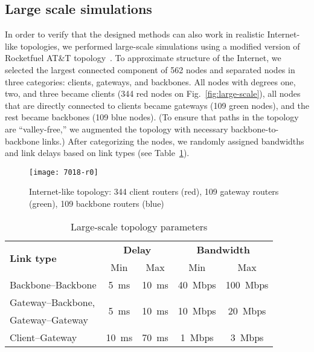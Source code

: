 \subsection{Large scale simulations}
\label{sec:largescale}


In order to verify that the designed methods can also work in realistic Internet-like topologies, we 
performed large-scale simulations using a modified version of Rocketfuel AT\&T topology~\cite{rocketfuel}.
To approximate structure of the Internet, we selected the largest connected component of 562 nodes and separated nodes in three categories: clients, gateways, and backbones.
All nodes with degrees one, two, and three became clients (344 red nodes on Fig.~\ref{fig:large-scale}), all nodes that are directly connected to clients became gateways (109 green nodes), and the rest became backbones (109 blue nodes).
(To ensure that paths in the topology are ``valley-free,'' we augmented the topology with necessary backbone-to-backbone links.)
After categorizing the nodes, we randomly assigned bandwidths and link delays based on link types (see Table~\ref{tab:large-scale}).

\begin{figure}[htbp]
  \centering
  \texttt{[image: 7018-r0]}
  \caption{Internet-like topology: 344 client routers (red), 109 gateway routers (green), 109 backbone routers (blue)}
  \label{fig:large-scale-topo}
\end{figure}


\begin{table}[htbp]
\centering
\caption{Large-scale topology parameters}
\label{tab:large-scale}
\begin{tabular}{|l||c|c||c|c|}
  \hline
  \multirow{2}{*}{\bf Link type} &  \multicolumn{2}{|c||}{\bf Delay} &  \multicolumn{2}{|c|}{\bf Bandwidth} \tabularnewline
  \cline{2-5}
                        &  Min & Max                       &  Min & Max \tabularnewline
  \hline \hline
  Backbone--Backbone    & 5~ms & 10~ms   & 40~Mbps & 100~Mbps \tabularnewline
  \hline
  Gateway--Backbone,    & \multirow{2}{*}{5~ms} & \multirow{2}{*}{10~ms}   
                        & \multirow{2}{*}{10~Mbps} & \multirow{2}{*}{20~Mbps} \tabularnewline
  Gateway--Gateway      & & & & \\
  \hline
  Client--Gateway       & 10~ms & 70~ms   & 1~Mbps  & 3~Mbps \\
  \hline

\end{tabular}
\end{table}


